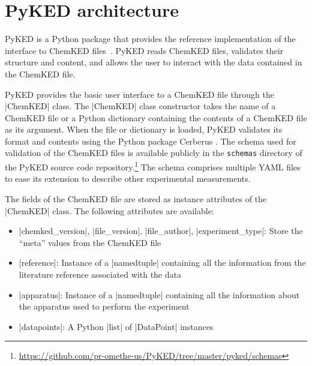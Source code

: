 \documentclass[12pt]{ijck}
\newcommand\ck{ChemKED}
\newcommand\pk{PyKED}
\begin{document}
\section{PyKED architecture}\label{sec:pyked-architecture}
%
\pk{} is a Python package that provides the reference implementation
of the interface to \ck{} files~\autocite{PyKED}. \pk{} reads \ck{} files, validates
their structure and content, and allows the user to interact with the data contained
in the \ck{} file.

\pk{} provides the basic user interface to a \ck{} file through the
\pybox|ChemKED| class. The \pybox|ChemKED| class constructor takes the name
of a \ck{} file or a Python dictionary containing the contents of a \ck{} file
as its argument. When the file or dictionary is loaded, \pk{} validates its
format and contents using the Python package Cerberus \autocite{cerberus}. The
schema used for validation of the \ck{} files is available publicly in the
\texttt{schemas} directory of the PyKED source code
repository.\footnote{\url{https://github.com/pr-omethe-us/PyKED/tree/master/pyked/schemas}}
The schema comprises multiple YAML files to ease its extension to describe other
experimental measurements.

The fields of the \ck{} file are stored as instance attributes of the
\pybox|ChemKED| class. The following attributes are available:
%
\begin{itemize}
    \item \pybox|chemked_version|, \pybox|file_version|, \pybox|file_author|,
    \pybox|experiment_type|: Store the ``meta'' values from the \ck{} file
    \item \pybox|reference|: Instance of a \pybox|namedtuple| containing all
    the information from the literature reference associated with the data
    \item \pybox|apparatus|: Instance of a \pybox|namedtuple| containing all
    the information about the apparatus used to perform the experiment
    \item \pybox|datapoints|: A Python \pybox|list| of \pybox|DataPoint| instances
\end{itemize}
\end{document}
